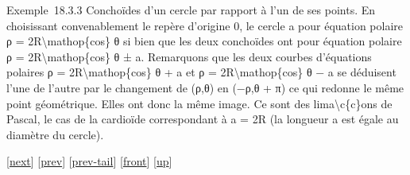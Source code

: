 \documentclass[]{article}
\begin{document}
Exemple~18.3.3 Conchoïdes d'un cercle par rapport à l'un de ses points.
En choisissant convenablement le repère d'origine 0, le cercle a pour
équation polaire ρ = 2R\textbackslash{}mathop\{cos\} θ si bien que les
deux conchoïdes ont pour équation polaire ρ =
2R\textbackslash{}mathop\{cos\} θ ± a. Remarquons que les deux courbes
d'équations polaires ρ = 2R\textbackslash{}mathop\{cos\} θ + a et ρ =
2R\textbackslash{}mathop\{cos\} θ − a se déduisent l'une de l'autre par
le changement de (ρ,θ) en (−ρ,θ + π) ce qui redonne le même point
géométrique. Elles ont donc la même image. Ce sont des
lima\textbackslash{}c\{c\}ons de Pascal, le cas de la cardioïde
correspondant à a = 2R (la longueur a est égale au diamètre du cercle).

{[}\href{coursse99.html}{next}{]} {[}\href{coursse97.html}{prev}{]}
{[}\href{coursse97.html\#tailcoursse97.html}{prev-tail}{]}
{[}\href{coursse98.html}{front}{]}
{[}\href{coursch19.html\#coursse98.html}{up}{]}
\end{document}
